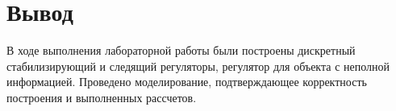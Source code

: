 \chapter{Вывод}
\label{ch:chap4}

В ходе выполнения лабораторной работы были построены дискретный стабилизирующий и следящий регуляторы, регулятор для объекта с неполной информацией. Проведено моделирование, подтверждающее корректность построения и выполненных рассчетов.

\endinput
